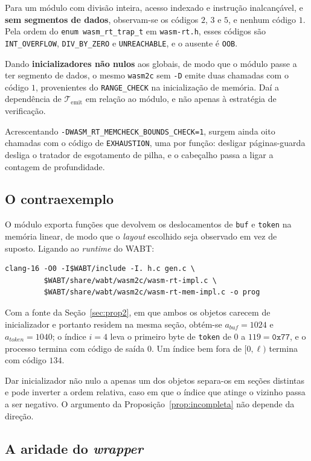 \documentclass[11pt,a4paper]{article}
\theoremstyle{definition}
\newcommand{\code}[1]{\texttt{#1}}
\begin{document}
Para um módulo com divisão inteira, acesso indexado e instrução inalcançável, e
\textbf{sem segmentos de dados}, observam-se os códigos $2$, $3$ e $5$, e nenhum
código $1$. Pela ordem do \code{enum wasm\_rt\_trap\_t} em \code{wasm-rt.h},
esses códigos são \code{INT\_OVERFLOW}, \code{DIV\_BY\_ZERO} e
\code{UNREACHABLE}, e o ausente é \code{OOB}.

Dando \textbf{inicializadores não nulos} aos globais, de modo que o módulo passe
a ter segmento de dados, o mesmo \code{wasm2c} sem \code{-D} emite duas chamadas
com o código $1$, provenientes do \code{RANGE\_CHECK} na inicialização de
memória. Daí a dependência de $\mathcal{T}_{\mathrm{emit}}$ em relação ao módulo,
e não apenas à estratégia de verificação.

Acrescentando \code{-DWASM\_RT\_MEMCHECK\_BOUNDS\_CHECK=1}, surgem ainda oito
chamadas com o código de \code{EXHAUSTION}, uma por função: desligar
páginas-guarda desliga o tratador de esgotamento de pilha, e o cabeçalho passa a
ligar a contagem de profundidade.

\subsection{O contraexemplo}

O módulo exporta funções que devolvem os deslocamentos de \code{buf} e
\code{token} na memória linear, de modo que o \emph{layout} escolhido seja
observado em vez de suposto. Ligando ao \emph{runtime} do WABT:

\begin{lstlisting}
clang-16 -O0 -I$WABT/include -I. h.c gen.c \
         $WABT/share/wabt/wasm2c/wasm-rt-impl.c \
         $WABT/share/wabt/wasm2c/wasm-rt-mem-impl.c -o prog
\end{lstlisting}

Com a fonte da Seção~\ref{sec:prop2}, em que ambos os objetos carecem de
inicializador e portanto residem na mesma seção, obtém-se
$a_{\mathit{buf}} = 1024$ e $a_{\mathit{token}} = 1040$; o índice $i = 4$ leva o
primeiro byte de \code{token} de $0$ a $119 = \mathtt{0x77}$, e o processo termina
com código de saída $0$. Um índice bem fora de $[0,\ell)$ termina com código
$134$.

Dar inicializador não nulo a apenas um dos objetos separa-os em seções distintas
e pode inverter a ordem relativa, caso em que o índice que atinge o vizinho passa
a ser negativo. O argumento da Proposição~\ref{prop:incompleta} não depende da
direção.

\subsection{A aridade do \emph{wrapper}}
\end{document}
